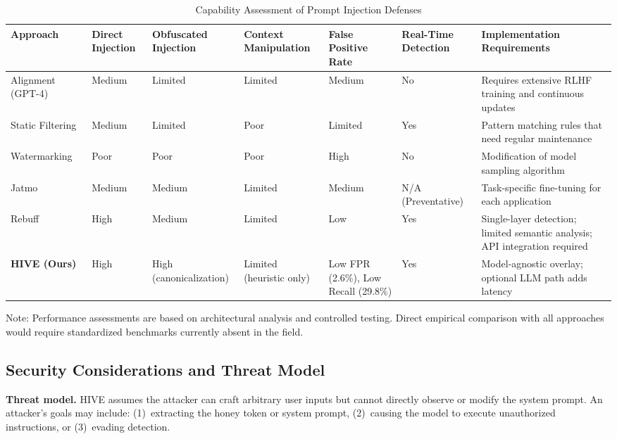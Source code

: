 \documentclass[manuscript,screen,review]{acmart}
\begin{document}
\begin{table}
\caption{Capability Assessment of Prompt Injection Defenses}
\label{tab:comparative-capability}
\setlength{\tabcolsep}{6pt}
\renewcommand{\arraystretch}{1.2}
\setcellgapes{4pt}
\makegapedcells
\centering
\scriptsize

\begin{tabular}{p{60pt}p{45pt}p{45pt}p{45pt}p{45pt}p{45pt}p{70pt}}
\toprule
\textbf{\small Approach} & \textbf{\small Direct Injection} & \textbf{\small Obfuscated Injection} & \textbf{\small Context Manipulation} & \textbf{\small False Positive Rate} & \textbf{\small Real-Time Detection} & \textbf{\small Implementation Requirements} \\
\midrule
Alignment (GPT-4)~\cite{b3} & 
Medium & 
Limited & 
Limited & 
Medium & 
No & 
Requires extensive RLHF training and continuous updates \\
\midrule
Static Filtering~\cite{b5} & 
Medium & 
Limited & 
Poor & 
Limited & 
Yes & 
Pattern matching rules that need regular maintenance \\
\midrule
Watermarking~\cite{b2} & 
Poor & 
Poor & 
Poor & 
High & 
No & 
Modification of model sampling algorithm \\
\midrule
Jatmo~\cite{b8} & 
Medium & 
Medium & 
Limited & 
Medium & 
N/A (Preventative) & 
Task-specific fine-tuning for each application \\
\midrule
Rebuff~\cite{b13} & 
High & 
Medium & 
Limited & 
Low & 
Yes & 
Single-layer detection; limited semantic analysis; API integration required \\
\midrule
\textbf{HIVE (Ours)} & 
High & 
High (canonicalization) & 
Limited (heuristic only) & 
Low FPR (2.6\%), Low Recall (29.8\%) & 
Yes & 
Model-agnostic overlay; optional LLM path adds latency \\
\bottomrule
\end{tabular}

{\footnotesize Note: Performance assessments are based on architectural analysis and controlled testing. Direct empirical comparison with all approaches would require standardized benchmarks currently absent in the field.}
\end{table}


\subsection{Security Considerations and Threat Model}
\label{sec:security-considerations}

\textbf{Threat model.} HIVE assumes the attacker can craft arbitrary user inputs but cannot directly observe or modify the system prompt. An attacker's goals may include: (1)~extracting the honey token or system prompt, (2)~causing the model to execute unauthorized instructions, or (3)~evading detection.
\end{document}
